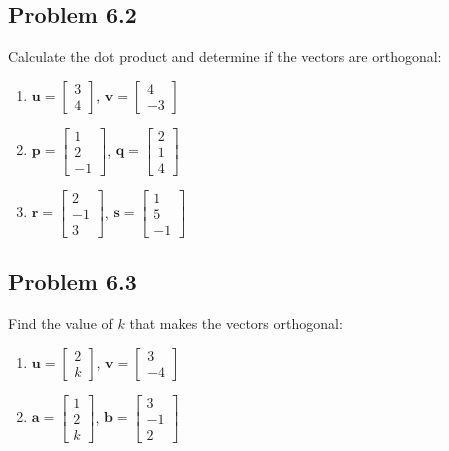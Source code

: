 \documentclass{article}
\begin{document}
\subsection{Problem 6.2}
Calculate the dot product and determine if the vectors are orthogonal:
\begin{enumerate}
\item $\mathbf{u} = \begin{bmatrix} 3 \\ 4 \end{bmatrix}$, $\mathbf{v} = \begin{bmatrix} 4 \\ -3 \end{bmatrix}$
\item $\mathbf{p} = \begin{bmatrix} 1 \\ 2 \\ -1 \end{bmatrix}$, $\mathbf{q} = \begin{bmatrix} 2 \\ 1 \\ 4 \end{bmatrix}$
\item $\mathbf{r} = \begin{bmatrix} 2 \\ -1 \\ 3 \end{bmatrix}$, $\mathbf{s} = \begin{bmatrix} 1 \\ 5 \\ -1 \end{bmatrix}$
\end{enumerate}

\subsection{Problem 6.3}
Find the value of $k$ that makes the vectors orthogonal:
\begin{enumerate}
\item $\mathbf{u} = \begin{bmatrix} 2 \\ k \end{bmatrix}$, $\mathbf{v} = \begin{bmatrix} 3 \\ -4 \end{bmatrix}$
\item $\mathbf{a} = \begin{bmatrix} 1 \\ 2 \\ k \end{bmatrix}$, $\mathbf{b} = \begin{bmatrix} 3 \\ -1 \\ 2 \end{bmatrix}$
\end{enumerate}
\end{document}
